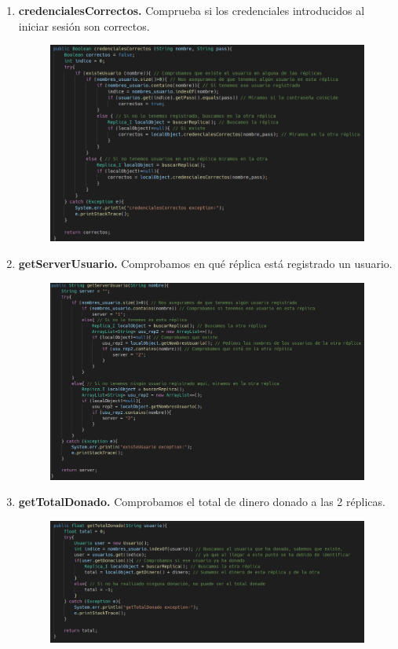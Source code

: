 \documentclass{article}
\begin{document}
\begin{enumerate}
\begin{figure}[H]
		\end{figure}
		\item {\bf credencialesCorrectos.} Comprueba si los credenciales introducidos al iniciar sesión son correctos.
		\begin{figure}[H]
			\centering
			\includegraphics[totalheight=7.8cm]{img/15.png}
		\end{figure}
		\item {\bf getServerUsuario.} Comprobamos en qué réplica está registrado un usuario.
		\begin{figure}[H]
			\centering
			\includegraphics[totalheight=8cm]{img/16.png}
		\end{figure}
		\item {\bf getTotalDonado.} Comprobamos el total de dinero donado a las 2 réplicas.
		\begin{figure}[H]
			\centering
			\includegraphics[totalheight=4.9cm]{img/17.png}
		\end{figure}
	\end{enumerate}
\end{document}
